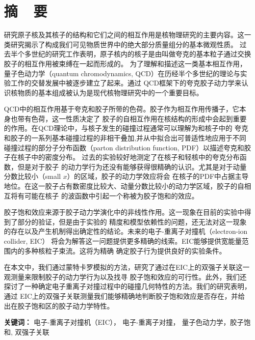 
\chapter*{\LARGE  \bfseries {摘\ \ 要} }


\qquad 研究原子核及其核子的结构和它们之间的相互作用是核物理研究的主要内容。这一类研究揭示了构成我们可见物质世界中的绝大部分质量组分的基本微观性质。
过去半个多世纪的研究工作表明，原子核内的核子是由叫做夸克的基本粒子通过交换胶子的相互作用被束缚在一起而形成的。
为了理解和描述这一类基本相互作用，量子色动力学（quantum chromodynamics,
QCD）在历经半个多世纪的理论与实验工作的交替发展中被逐步建立了起来。通过
QCD框架下的夸克胶子动力学来认识核物质的基本组成被认为是现代核物理研究中的一个重要目标。

QCD中的相互作用基于夸克和胶子所带的色荷。胶子作为相互作用传播子，它本身也带有色荷，这一性质决定了
胶子的自相互作用在核结构的形成中会起到重要的作用。在QCD理论中，与核子发生的碰撞过程通常可以理解为和核子中的
夸克和胶子的一系列基本碰撞过程的非相干叠加,并从中拟合出可普适性地应用于不同碰撞过程的部分子分布函数（parton distribution function,
PDF）以描述夸克和胶子在核子中的密度分布。 过去的实验较好地测定了在核子和轻核中的夸克分布函数，但是对于胶子
的动力学行为还没有能够获得很精确的认识。尤其是对于动量分数比较小（small $x$）的区域，胶子的动力学效应将会
在核子的PDF中占据主导地位。在这一胶子占有数密度比较大、动量分数比较小的动力学区域，胶子的自相互将有可能在核子 的波函数中引起一个称被为胶子饱和的效应。

胶子饱和效应来源于胶子动力学演化中的非线性作用。这一现象在目前的实验中得到了部分的验证，但是由于实验的
精度和模型依赖性的问题，还无法对这一现象的存在以及产生机制得出确定性的结论。未来的电子-重离子对撞机（electron-ion collider, EIC）
将会为解答这一问题提供更多精确的线索。EIC能够提供宽能量范围内的多种核粒子束流。这将为精确 确定胶子行为提供良好的实验条件。

在本文中，我们通过蒙特卡罗模拟的方法，研究了通过在EIC上的双强子关联这一观测量来限制胶子的动力学行为以及找寻
胶子饱和效应的可行性。此外，我们还探讨了一种确定电子重离子对撞过程中的碰撞几何特性的方法。我们的研究表明，通过
EIC上的双强子关联测量我们能够精确地判断胶子饱和效应是否存在，并给出在胶子饱和区的胶子动力学特性。

\vspace{4mm}

\textbf{关键词：} 电子-重离子对撞机（EIC）， 电子-重离子对撞， 量子色动力学，胶子饱和, 双强子关联


